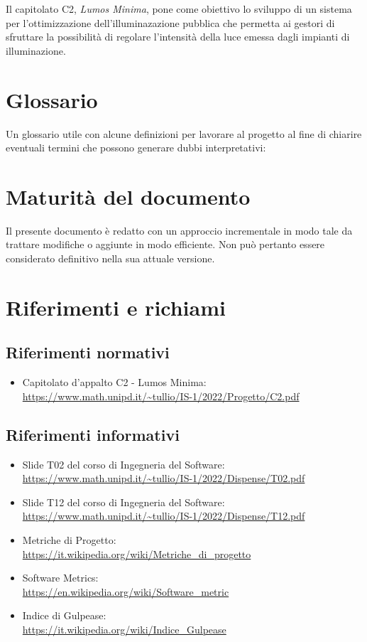 Il capitolato C2, \textit{Lumos Minima}, pone come obiettivo lo sviluppo di un sistema per l'ottimizzazione dell'illuminazazione pubblica che permetta ai gestori di sfruttare la possibilità di regolare l'intensità della luce emessa dagli impianti di illuminazione.

\section{Glossario}
Un glossario utile con alcune definizioni per lavorare al progetto al fine di chiarire eventuali termini che possono generare dubbi interpretativi:

\section{Maturità del documento}
Il presente documento è redatto con un approccio incrementale in modo tale da trattare modifiche o aggiunte in modo efficiente. Non può pertanto essere considerato definitivo nella sua attuale versione.

\section{Riferimenti e richiami}
\subsection{Riferimenti normativi}
\begin{itemize}
    \item Capitolato d'appalto C2 - Lumos Minima: \\ \url{https://www.math.unipd.it/~tullio/IS-1/2022/Progetto/C2.pdf}
\end{itemize}

\subsection{Riferimenti informativi}
\begin{itemize}
    \item Slide T02 del corso di Ingegneria del Software: \\ \url{https://www.math.unipd.it/~tullio/IS-1/2022/Dispense/T02.pdf}
    \item Slide T12 del corso di Ingegneria del Software: \\ \url{https://www.math.unipd.it/~tullio/IS-1/2022/Dispense/T12.pdf}
    \item Metriche di Progetto: \\ \url{https://it.wikipedia.org/wiki/Metriche_di_progetto}
    \item Software Metrics: \\ \url{https://en.wikipedia.org/wiki/Software_metric}
    \item Indice di Gulpease: \\ \url{https://it.wikipedia.org/wiki/Indice_Gulpease}
\end{itemize}